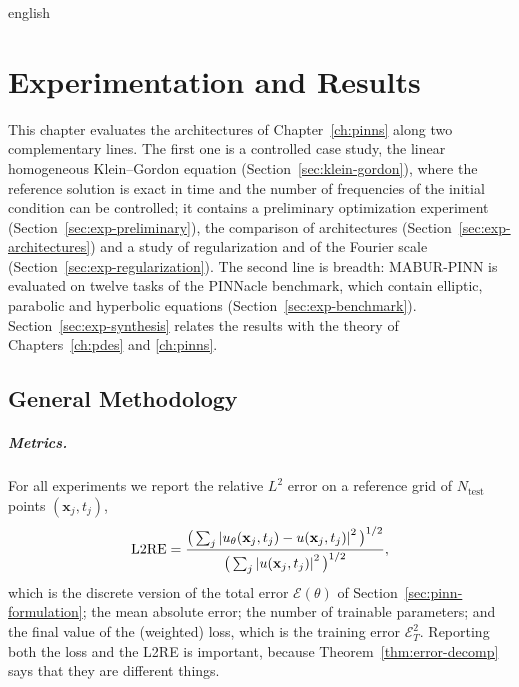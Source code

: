 \documentclass[../0000.tex]{subfiles}
\begin{document}

\begin{hyphenrules}{english}

\chapter{Experimentation and Results}\label{ch:experiments}

This chapter evaluates the architectures of Chapter~\ref{ch:pinns} along two complementary lines. The first
one is a controlled case study, the linear homogeneous Klein--Gordon equation (Section~\ref{sec:klein-gordon}),
where the reference solution is exact in time and the number of frequencies of the initial condition can
be controlled; it contains a preliminary optimization experiment (Section~\ref{sec:exp-preliminary}), the
comparison of architectures (Section~\ref{sec:exp-architectures}) and a study of regularization and of the
Fourier scale (Section~\ref{sec:exp-regularization}). The second line is breadth: MABUR-PINN is evaluated on
twelve tasks of the PINNacle benchmark, which contain elliptic, parabolic and hyperbolic equations
(Section~\ref{sec:exp-benchmark}). Section~\ref{sec:exp-synthesis} relates the results with the theory of
Chapters~\ref{ch:pdes} and \ref{ch:pinns}.

\section{General Methodology}\label{sec:exp-methodology}

\paragraph{Metrics.}
For all experiments we report the relative $L^2$ error on a reference grid of
$N_{\mathrm{test}}$ points $(\mathbf{x}_j,t_j)$,
\begin{equation}
  \mathrm{L2RE}=\frac{\big(\sum_j\left\lvert u_\theta(\mathbf{x}_j,t_j)-u(\mathbf{x}_j,t_j) \right\rvert^2\big)^{1/2}}{\big(\sum_j\left\lvert u(\mathbf{x}_j,t_j) \right\rvert^2\big)^{1/2}},
  \label{eq:l2re}
\end{equation}
which is the discrete version of the total error $\mathcal{E}(\theta)$ of Section~\ref{sec:pinn-formulation};
the mean absolute error; the number of trainable parameters; and the final value of the (weighted)
loss, which is the training error $\mathcal{E}_T^2$. Reporting both the loss and the L2RE is important,
because Theorem~\ref{thm:error-decomp} says that they are different things.


\end{hyphenrules}
\end{document}
